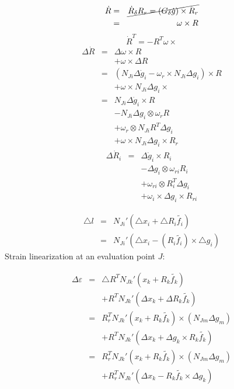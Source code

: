 \begin{eqnarray*}
\dot{R} & = & \cancel{\dot{R}_{\delta}R_{r}=(G_{\delta}\dot{g})\times R_{r}}\\
 & = & \omega\times R
\end{eqnarray*}
\[
\dot{R}^{T}=-R^{T}\omega\times
\]
\begin{eqnarray*}
\Delta\dot{R} & = & \Delta\omega\times R\\
 &  & +\omega\times\Delta R\\
 & = & \left(N_{Ji}\Delta\dot{g}_{i}-\omega_{r}\times N_{Ji}\Delta g_{i}\right)\times R\\
 &  & +\omega\times N_{Ji}\Delta g_{i}\times\\
 & = & N_{Ji}\Delta\dot{g}_{i}\times R\\
 &  & -N_{Ji}\Delta g_{i}\otimes\omega_{r}R\\
 &  & +\omega_{r}\otimes N_{Ji}R^{T}\Delta g_{i}\\
 &  & +\omega\times N_{Ji}\Delta g_{i}\times R_r
\end{eqnarray*}
\begin{eqnarray*}
\Delta\dot{R}_{i} & = & \Delta\dot{g}_{i}\times R_{i}\\
 &  & -\Delta g_{i}\otimes\omega_{ri}R_{i}\\
 &  & +\omega_{ri}\otimes R_{i}^{T}\Delta g_{i}\\
 &  & +\omega_{i}\times\Delta g_{i}\times R_{ri}
\end{eqnarray*}

\begin{eqnarray*}
\triangle l & = & N_{Ji}'(\triangle x_{i}+\triangle R_{i}\tilde{f_{i}})\\
 & = & N_{Ji}'(\triangle x_{i}-(R_{i}\tilde{f_{i}})\times\triangle g_{i})
\end{eqnarray*}
Strain linearization at an evaluation point $J$:

\begin{eqnarray*}
\Delta\varepsilon & = & \triangle R^{T}N_{Jk}'(x_{k}+R_{k}\tilde{f_{k}})\\
 &  & +R^{T}N_{Jk}'(\Delta x_{k}+\Delta R_{k}\tilde{f_{k}})\\
 & = & R_{r}^{T}N_{Jk}'(x_{k}+R_{k}\tilde{f_{k}})\times(N_{Jm}\Delta g_{m})\\
 &  & +R^{T}N_{Jk}'(\Delta x_{k}+\Delta g_{k}\times R_{k}\tilde{f_{k}})\\
 & = & R_{r}^{T}N_{Jk}'(x_{k}+R_{k}\tilde{f_{k}})\times(N_{Jm}\Delta g_{m})\\
 &  & +R_{r}^{T}N_{Jk}'(\Delta x_{k}-R_{k}\tilde{f_{k}}\times\Delta g_{k})
\end{eqnarray*}

